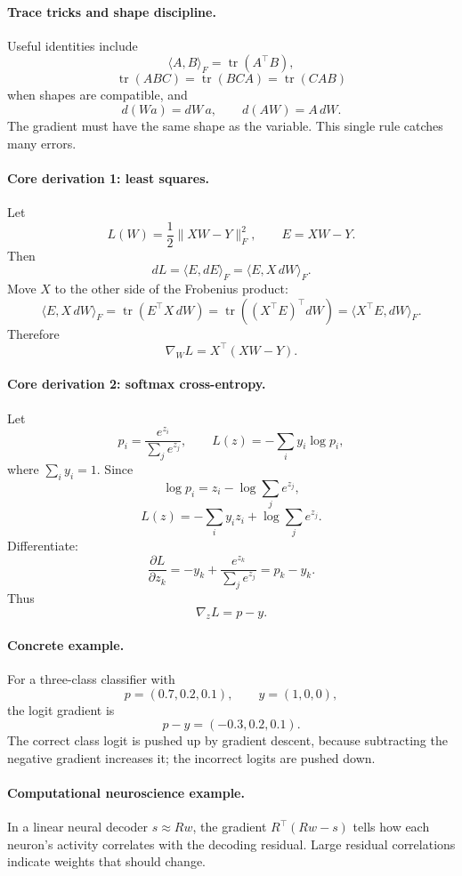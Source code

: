 \paragraph{Trace tricks and shape discipline.}
Useful identities include
\[
\langle A,B\rangle_F=\operatorname{tr}(A^\top B),
\]
\[
\operatorname{tr}(ABC)=\operatorname{tr}(BCA)=\operatorname{tr}(CAB)
\]
when shapes are compatible, and
\[
d(Wa)=dW\,a,\qquad d(AW)=A\,dW.
\]
The gradient must have the same shape as the variable. This single rule catches many errors.

\paragraph{Core derivation 1: least squares.}
Let
\[
L(W)=\frac12\|XW-Y\|_F^2,
\qquad E=XW-Y.
\]
Then
\[
dL=\langle E,dE\rangle_F=\langle E,X\,dW\rangle_F.
\]
Move \(X\) to the other side of the Frobenius product:
\[
\langle E,X\,dW\rangle_F
=\operatorname{tr}(E^\top X\,dW)
=\operatorname{tr}((X^\top E)^\top dW)
=\langle X^\top E,dW\rangle_F.
\]
Therefore
\[
\boxed{\nabla_W L=X^\top(XW-Y).}
\]

\paragraph{Core derivation 2: softmax cross-entropy.}
Let
\[
p_i=\frac{e^{z_i}}{\sum_j e^{z_j}},
\qquad
L(z)=-\sum_i y_i\log p_i,
\]
where \(\sum_i y_i=1\). Since
\[
\log p_i=z_i-\log\sum_j e^{z_j},
\]
\[
L(z)=-\sum_i y_i z_i+\log\sum_j e^{z_j}.
\]
Differentiate:
\[
\frac{\partial L}{\partial z_k}
=-y_k+\frac{e^{z_k}}{\sum_j e^{z_j}}
=p_k-y_k.
\]
Thus
\[
\boxed{\nabla_z L=p-y.}
\]

\paragraph{Concrete example.}
For a three-class classifier with
\[
p=(0.7,0.2,0.1),\qquad y=(1,0,0),
\]
the logit gradient is
\[
p-y=(-0.3,0.2,0.1).
\]
The correct class logit is pushed up by gradient descent, because subtracting the negative gradient increases it; the incorrect logits are pushed down.

\paragraph{Computational neuroscience example.}
In a linear neural decoder \(s\approx Rw\), the gradient \(R^\top(Rw-s)\) tells how each neuron's activity correlates with the decoding residual. Large residual correlations indicate weights that should change.

